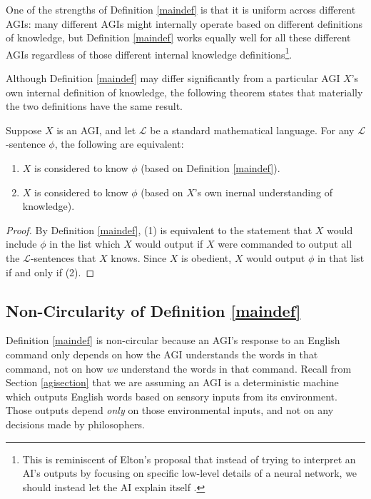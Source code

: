 \documentclass[runningheads]{llncs}
\begin{document}
One of the strengths of Definition \ref{maindef} is that it is uniform across
different AGIs: many different AGIs might internally operate based on different
definitions of knowledge, but Definition \ref{maindef} works equally well for
all these different AGIs regardless of those different internal knowledge
definitions\footnote{This is reminiscent of Elton's proposal that instead of
trying to interpret an AI's outputs by focusing on specific low-level details
of a neural network, we should instead let the AI explain itself \cite{elton}.}.

Although Definition \ref{maindef} may differ significantly from a particular AGI
$X$'s own internal definition of knowledge, the following theorem states that
materially the two definitions have the same result.

\begin{theorem}
\label{sentenceequivalence}
  Suppose $X$ is an AGI, and let $\mathscr L$
  be a standard mathematical language. For any $\mathscr L$-sentence $\phi$, the following
  are equivalent:
  \begin{enumerate}
    \item $X$ is
    considered to know $\phi$ (based on Definition \ref{maindef}).
    \item
    $X$ is considered to know $\phi$ (based on $X$'s own inernal understanding of
    knowledge).
  \end{enumerate}
\end{theorem}

\begin{proof}
  By Definition \ref{maindef}, (1) is equivalent to the statement that $X$ would
  include $\phi$ in the list which $X$ would output if $X$ were commanded to output
  all the $\mathscr L$-sentences that $X$ knows. Since $X$ is obedient, $X$ would output
  $\phi$ in that list if and only if (2).
\end{proof}

\subsection{Non-Circularity of Definition \ref{maindef}}
\label{noncircularsubsection}

Definition \ref{maindef} is non-circular because an AGI's response to an English
command only depends on how the AGI understands the words in that command, not
on how \emph{we} understand the words in that command. Recall from Section \ref{agisection}
that we are assuming an AGI is a deterministic machine which outputs English words
based on sensory inputs from its environment. Those outputs depend \emph{only} on those
environmental inputs, and not on any decisions made by philosophers.
\end{document}
